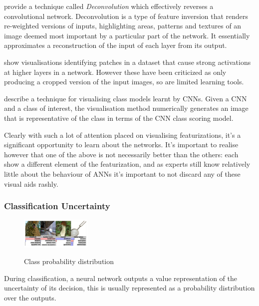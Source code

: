 \documentclass[a4paper,11pt,titlepage]{article}
\begin{document}
		\textbf{\cite{Zeiler2013}} provide a technique called \textit{Deconvolution} \cite{Zeiler2011} which effectively reverses a convolutional network. Deconvolution is a type of feature inversion that renders re-weighted versions of inputs, highlighting areas, patterns and textures of an image deemed most important by a particular part of the network. It essentially approximates a reconstruction of the input of each layer from its output.
		\par
		\textbf{\cite{Donahue2013}} show visualisations identifying patches in a dataset that cause strong activations at higher layers in a network. However these have been criticized as only producing a cropped version of the input images, so are limited learning tools. 
		\par 
		\textbf{\cite{Simonyan2013}} describe a technique for visualising class models learnt by CNNs. Given a CNN and a class of interest, the visualisation method numerically generates an image that is representative of the class in terms of the CNN class scoring model.
		\par 
		Clearly with such a lot of attention placed on visualising featurizations, it's a significant opportunity to learn about the networks. It's important to realise however that one of the above is not necessarily better than the others: each show a different element of the featurization, and as experts still know relatively little about the behaviour of ANNs it's important to not discard any of these visual aids rashly.
		
		\subsubsection{Classification Uncertainty}
		 		
 	\begin{figure}[H]
    			\centering	
			{{\includegraphics[width=0.3\textwidth]
    				{img/hinton_probability.png} 
    			}}%
    			\caption{Class probability distribution}%
    		\label{fig:lascaux}
	\end{figure}
 		
 		During classification, a neural network outputs a value representation of the uncertainty of its decision, this is usually represented as a probability distribution over the outputs. 
\end{document}
